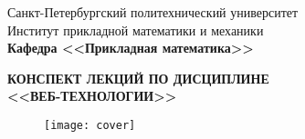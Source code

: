 \documentclass[main.tex]{subfiles}
\begin{document}
\begin{titlepage}
\begin{center}
	\begin{large}
		Санкт-Петербургский политехнический университет\\
		Институт прикладной математики и механики\\
		\textbf{Кафедра <<Прикладная математика>>}\\
	\end{large}
	\vfill
	\Large{\textbf{КОНСПЕКТ ЛЕКЦИЙ ПО ДИСЦИПЛИНЕ \\
			 <<ВЕБ-ТЕХНОЛОГИИ>>}}
\end{center}
\vfill
\begin{figure}[H]
	\centering \texttt{[image: cover]}
\end{figure}
\vfill
{}
\end{titlepage}
\end{document}
